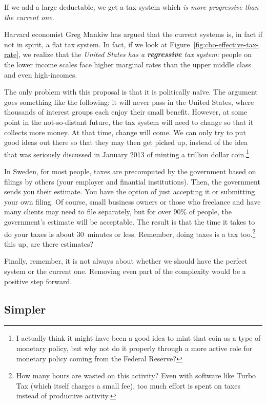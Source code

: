 If we add a large deductable, we get a tax-system which \emph{is more
progressive than the current one}.

Harvard economist Greg Mankiw has argued that the current systems is, in fact
if not in spirit, a flat tax system.
In fact, if we look at Figure~\ref{fig:cbo-effective-tax-rate}, we realize that
the \emph{United States has a \textbf{regressive} tax system}: people on the
lower income scales face higher marginal rates than the upper middle class and
even high-incomes.

The only problem with this proposal is that it is politically naïve. The
argument goes something like the following: it will never pass in the United
States, where thousands of interest groups each enjoy their small benefit.
However, at some point in the not-so-distant future, the tax system will need
to change so that it collects more money. At that time, change will come. We
can only try to put good ideas out there so that they may then get picked up,
instead of the idea that was seriously discussed in January 2013 of minting a
trillion dollar coin.\footnote{I actually think it might have been a good idea
to mint that coin as a type of monetary policy, but why not do it properly
through a more active role for monetary policy coming from the Federal
Reserve?}

In Sweden, for most people, taxes are precomputed by the government based on
filings by others (your employer and finantial institutions). Then, the
government sends you their estimate. You have the option of just accepting it
or submitting your own filing. Of course, small business owners or those who
freelance and have many clients may need to file separately, but for over 90\%
of people, the government's estimate will be acceptable. The result is that the
time it takes to do your taxes is about 30~minutes or less. Remember, doing
taxes is a tax too.\footnote{How many hours are wasted on this activity? Even
with software like Turbo Tax (which itself charges a small fee), too much
effort is spent on taxes instead of productive activity.}%
this up, are there estimates?

Finally, remember, it is not always about whether we should have the perfect
system or the current one. Removing even part of the complexity would be a
positive step forward.

\subsection{Simpler}

